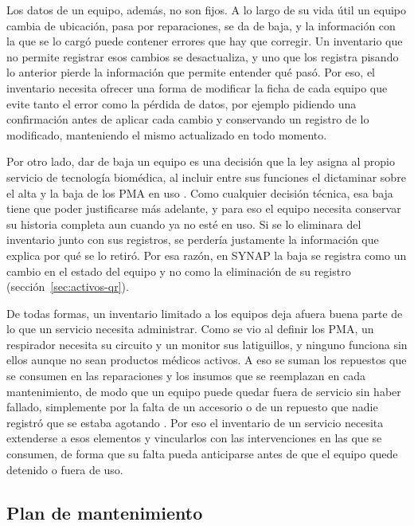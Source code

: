 \documentclass[10pt]{article}
\begin{document}
Los datos de un equipo, además, no son fijos. A lo largo de su vida útil un equipo cambia de ubicación, pasa por reparaciones, se da de baja, y la información con la que se lo cargó puede contener errores que hay que corregir. Un inventario que no permite registrar esos cambios se desactualiza, y uno que los registra pisando lo anterior pierde la información que permite entender qué pasó. Por eso, el inventario necesita ofrecer una forma de modificar la ficha de cada equipo que evite tanto el error como la pérdida de datos, por ejemplo pidiendo una confirmación antes de aplicar cada cambio y conservando un registro de lo modificado, manteniendo el mismo actualizado en todo momento.

Por otro lado, dar de baja un equipo es una decisión que la ley asigna al propio servicio de tecnología biomédica, al incluir entre sus funciones el dictaminar sobre el alta y la baja de los PMA en uso \cite{ley_26906}. Como cualquier decisión técnica, esa baja tiene que poder justificarse más adelante, y para eso el equipo necesita conservar su historia completa aun cuando ya no esté en uso. Si se lo eliminara del inventario junto con sus registros, se perdería justamente la información que explica por qué se lo retiró. Por esa razón, en SYNAP la baja se registra como un cambio en el estado del equipo y no como la eliminación de su registro (sección~\ref{sec:activos-qr}).

De todas formas, un inventario limitado a los equipos deja afuera buena parte de lo que un servicio necesita administrar. Como se vio al definir los PMA, un respirador necesita su circuito y un monitor sus latiguillos, y ninguno funciona sin ellos aunque no sean productos médicos activos. A eso se suman los repuestos que se consumen en las reparaciones y los insumos que se reemplazan en cada mantenimiento, de modo que un equipo puede quedar fuera de servicio sin haber fallado, simplemente por la falta de un accesorio o de un repuesto que nadie registró que se estaba agotando \cite{oms_inventarios_2012}. Por eso el inventario de un servicio necesita extenderse a esos elementos y vincularlos con las intervenciones en las que se consumen, de forma que su falta pueda anticiparse antes de que el equipo quede detenido o fuera de uso.

\subsection{Plan de mantenimiento}
\label{sec:plan-mantenimiento}
\end{document}
